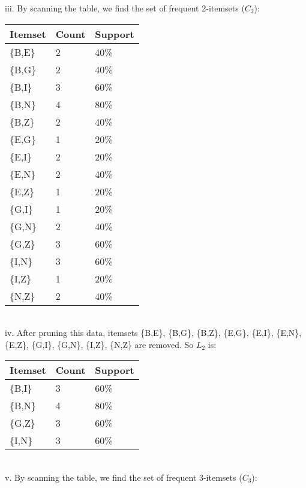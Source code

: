 \documentclass[10pt]{article}
\begin{document}
\begin{flushleft}
\vspace{20em}
iii. By scanning the table, we find the set of frequent 2-itemsets ($C_{2}$):\\
\vspace{0.5em}
\begin{tabular}{| l | l | l |}
\hline
Itemset & Count & Support \\ \hline
\{B,E\} & 2 & 40\%\\ \hline
\{B,G\} & 2 & 40\%\\ \hline
\{B,I\} & 3 & 60\%\\ \hline
\{B,N\} & 4 & 80\%\\ \hline
\{B,Z\} & 2 & 40\%\\ \hline
\{E,G\} & 1 & 20\%\\ \hline
\{E,I\} & 2 & 20\%\\ \hline
\{E,N\} & 2 & 40\%\\ \hline
\{E,Z\} & 1 & 20\%\\ \hline
\{G,I\} & 1 & 20\%\\ \hline
\{G,N\} & 2 & 40\%\\ \hline
\{G,Z\} & 3 & 60\%\\ \hline
\{I,N\} & 3 & 60\%\\ \hline
\{I,Z\} & 1 & 20\%\\ \hline
\{N,Z\} & 2 & 40\%\\ \hline
\end{tabular}
\\
\vspace{0.5em}
iv. After pruning this data, itemsets \{B,E\}, \{B,G\}, \{B,Z\}, \{E,G\}, \{E,I\}, \{E,N\}, \{E,Z\}, \{G,I\}, \{G,N\}, \{I,Z\}, \{N,Z\} are removed. So $L_{2}$ is: \\
\vspace{0.5em}
\begin{tabular}{| l | l | l |}
\hline
Itemset & Count & Support \\ \hline
\{B,I\} & 3 & 60\%\\ \hline
\{B,N\} & 4 & 80\%\\ \hline
\{G,Z\} & 3 & 60\%\\ \hline
\{I,N\} & 3 & 60\%\\ \hline
\end{tabular}
\\
\vspace{0.5em}
v. By scanning the table, we find the set of frequent 3-itemsets ($C_{3}$):\\
\vspace{0.5em}
\begin{tabular}{| l | l | l |}

\end{tabular}
\end{flushleft}
\end{document}
